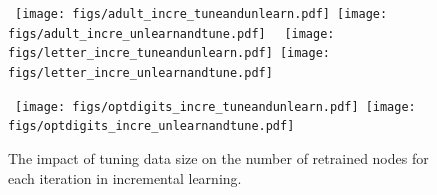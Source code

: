 
\begin{figure}[thbp]
\hspace{-.05in}
\centering
\mbox{
\hspace{.45in}
\texttt{[image: figs/adult\_incre\_tuneandunlearn.pdf]}
\hspace{-.15in}
\texttt{[image: figs/adult\_incre\_unlearnandtune.pdf]}
}
\mbox{
\hspace{.45in}
\texttt{[image: figs/letter\_incre\_tuneandunlearn.pdf]}
\hspace{-.15in}
\texttt{[image: figs/letter\_incre\_unlearnandtune.pdf]}
}

\mbox{
\hspace{.45in}
\texttt{[image: figs/optdigits\_incre\_tuneandunlearn.pdf]}
\hspace{-.15in}
\texttt{[image: figs/optdigits\_incre\_unlearnandtune.pdf]}
}
\vspace{-.25in}
\caption{The impact of tuning data size on the number of retrained nodes for each iteration in incremental learning.}
\label{fig:batch_add_remove}
\vspace{-.2in}
\end{figure}

